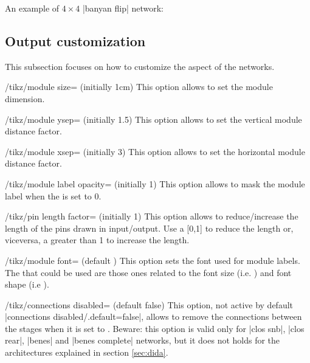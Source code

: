 \documentclass{ltxdoc}
\begin{document}
An example of $4\times 4$ |banyan flip| network:
\begin{codeexample}[]
\begin{tikzpicture}
    \node[P=4,banyan flip] {};
\end{tikzpicture}
\end{codeexample}


\subsection{Output customization}
\label{subsec:customization}
This subsection focuses on how to customize the aspect of the networks.

\begin{key}{/tikz/module size= (initially 1cm)}
    This option allows to set the module dimension.
\end{key}

\begin{key}{/tikz/module ysep= (initially 1.5)}
    This option allows to set the vertical module distance factor.
\end{key}

\begin{key}{/tikz/module xsep= (initially 3)}
    This option allows to set the horizontal module distance factor.
\end{key}

\begin{key}{/tikz/module label opacity= (initially 1)}
    This option allows to mask the module label when the  is set to 0.
\end{key}

\begin{key}{/tikz/pin length factor= (initially 1)}
    This option allows to reduce/increase the length of the pins drawn in input/output. Use a  [0,1] to reduce the length or, viceversa, a  greater than 1 to increase the length.
\end{key}

\begin{key}{/tikz/module font= (default )}
    This option sets the font used for module labels. The  that could be used are those ones related to the font size (i.e. ) and font shape (i.e ).
\end{key}

\begin{key}{/tikz/connections disabled= (default false)}
	This option, not active by default |connections disabled/.default=false|, allows to remove the connections between the stages when it is set to . Beware: this option is valid only for |clos snb|, |clos rear|, |benes| and |benes complete| networks, but it does not holds for the architectures explained in section \ref{sec:dida}.
\end{key}
\end{document}
